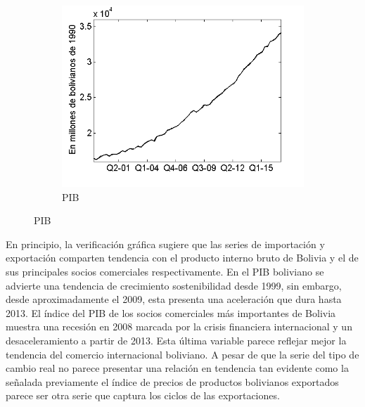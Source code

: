 \documentclass[12pt,letterpaper]{article}
\begin{document}
\begin{figure}
    \begin{subfigure}[b]{0.3\textwidth}
        \includegraphics[width=\textwidth]{4pib}
        \caption{PIB}
        \label{4pib}
    \end{subfigure}
\end{figure}

En principio, la verificación gráfica sugiere que las series de importación y exportación comparten tendencia con el producto interno bruto de Bolivia y el de sus principales socios comerciales respectivamente. En el PIB boliviano se advierte una tendencia de crecimiento sostenibilidad desde 1999, sin embargo, desde aproximadamente el 2009, esta presenta una aceleración que dura hasta 2013. El índice del PIB de los socios comerciales más importantes de Bolivia muestra una recesión en 2008 marcada por la crisis financiera internacional y un desaceleramiento a partir de 2013. Esta última variable parece reflejar mejor la tendencia del comercio internacional boliviano. A pesar de que la serie del tipo de cambio real no parece presentar una relación en tendencia tan evidente como la señalada previamente el índice de precios de productos bolivianos exportados parece ser otra serie que captura los ciclos de las exportaciones.
\end{document}
